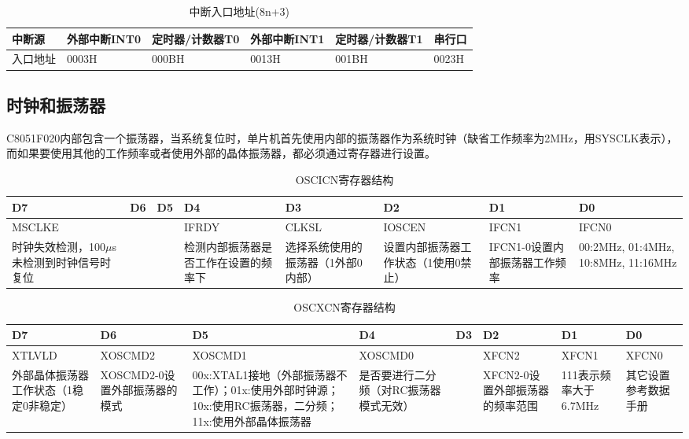 \begin{spacing}{1.3}
\begin{table}[H]
\centering
\begin{tabular}{|p{1.8cm}<{\centering}|p{2.5cm}<{\centering}|p{2.8cm}<{\centering}|p{2.5cm}<{\centering}|p{2.8cm}<{\centering}|p{1.5cm}<{\centering}|}
\toprule
中断源 & 外部中断INT0 & 定时器/计数器T0 & 外部中断INT1 & 定时器/计数器T1 & 串行口 \\
\midrule
入口地址 & 0003H & 000BH & 0013H & 001BH & 0023H \\
\bottomrule
\end{tabular}
\caption{中断入口地址(8n+3)}
\end{table}

\subsection{时钟和振荡器}

C8051F020内部包含一个振荡器，当系统复位时，单片机首先使用内部的振荡器作为系统时钟（缺省工作频率为2MHz，用SYSCLK表示），而如果要使用其他的工作频率或者使用外部的晶体振荡器，都必须通过寄存器进行设置。

\begin{table}[H]
\centering
\begin{tabular}{|p{1.8cm}<{\centering}|p{1.5cm}<{\centering}|p{1.5cm}<{\centering}|p{1.5cm}<{\centering}|p{1.5cm}<{\centering}|p{1.5cm}<{\centering}|p{1.5cm}<{\centering}|p{2cm}<{\centering}|}
\toprule
D7 & D6 & D5 & D4 & D3 & D2 & D1 & D0 \\
\midrule
MSCLKE & & & IFRDY & CLKSL & IOSCEN & IFCN1 & IFCN0 \\
\midrule
时钟失效检测，100$\mu$s未检测到时钟信号时复位 & & & 检测内部振荡器是否工作在设置的频率下 & 选择系统使用的振荡器（1外部0内部） & 设置内部振荡器工作状态（1使用0禁止） & IFCN1-0设置内部振荡器工作频率 & 00:2MHz, 01:4MHz, 10:8MHz, 11:16MHz \\
\bottomrule
\end{tabular}
\caption{OSCICN寄存器结构}
\end{table}

\begin{table}[H]
\centering
\begin{tabular}{|p{1.5cm}<{\centering}|p{2cm}<{\centering}|p{2cm}<{\centering}|p{2cm}<{\centering}|p{1cm}<{\centering}|p{1.5cm}<{\centering}|p{1.5cm}<{\centering}|p{1.5cm}<{\centering}|}
\toprule
D7 & D6 & D5 & D4 & D3 & D2 & D1 & D0 \\
\midrule
XTLVLD & XOSCMD2 & XOSCMD1 & XOSCMD0 & & XFCN2 & XFCN1 & XFCN0 \\
\midrule
外部晶体振荡器工作状态（1稳定0非稳定） & XOSCMD2-0设置外部振荡器的模式 & 00x:XTAL1接地（外部振荡器不工作）；01x:使用外部时钟源；10x:使用RC振荡器，二分频；11x:使用外部晶体振荡器 & 是否要进行二分频（对RC振荡器模式无效） & & XFCN2-0设置外部振荡器的频率范围 & 111表示频率大于6.7MHz & 其它设置参考数据手册 \\
\bottomrule
\end{tabular}
\caption{OSCXCN寄存器结构}
\end{table}


\end{spacing}
